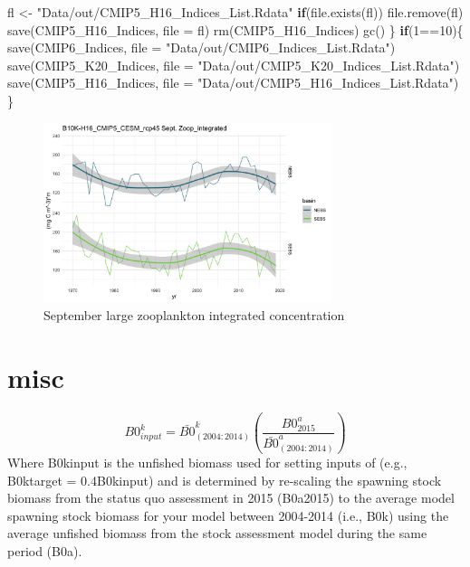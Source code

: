\documentclass[
]{article}
\newenvironment{Shaded}{\begin{snugshade}}{\end{snugshade}}
\newcommand{\AttributeTok}[1]{\textcolor[rgb]{0.77,0.63,0.00}{#1}}
\newcommand{\ControlFlowTok}[1]{\textcolor[rgb]{0.13,0.29,0.53}{\textbf{#1}}}
\newcommand{\DecValTok}[1]{\textcolor[rgb]{0.00,0.00,0.81}{#1}}
\newcommand{\FunctionTok}[1]{\textcolor[rgb]{0.00,0.00,0.00}{#1}}
\newcommand{\NormalTok}[1]{#1}
\newcommand{\OtherTok}[1]{\textcolor[rgb]{0.56,0.35,0.01}{#1}}
\newcommand{\SpecialCharTok}[1]{\textcolor[rgb]{0.00,0.00,0.00}{#1}}
\newcommand{\StringTok}[1]{\textcolor[rgb]{0.31,0.60,0.02}{#1}}
\begin{document}
\begin{Shaded}
\begin{Highlighting}[]
\NormalTok{      fl }\OtherTok{\textless{}{-}} \StringTok{"Data/out/CMIP5\_H16\_Indices\_List.Rdata"}
      \ControlFlowTok{if}\NormalTok{(}\FunctionTok{file.exists}\NormalTok{(fl)) }\FunctionTok{file.remove}\NormalTok{(fl)}
      \FunctionTok{save}\NormalTok{(CMIP5\_H16\_Indices, }\AttributeTok{file =}\NormalTok{ fl)}
      \FunctionTok{rm}\NormalTok{(CMIP5\_H16\_Indices)}
      \FunctionTok{gc}\NormalTok{()}
\NormalTok{    \}}
    \ControlFlowTok{if}\NormalTok{(}\DecValTok{1}\SpecialCharTok{==}\DecValTok{10}\NormalTok{)\{}
      \FunctionTok{save}\NormalTok{(CMIP6\_Indices, }\AttributeTok{file =} \StringTok{"Data/out/CMIP6\_Indices\_List.Rdata"}\NormalTok{)}
      \FunctionTok{save}\NormalTok{(CMIP5\_K20\_Indices, }\AttributeTok{file =} \StringTok{"Data/out/CMIP5\_K20\_Indices\_List.Rdata"}\NormalTok{)}
      \FunctionTok{save}\NormalTok{(CMIP5\_H16\_Indices, }\AttributeTok{file =} \StringTok{"Data/out/CMIP5\_H16\_Indices\_List.Rdata"}\NormalTok{)}
\NormalTok{    \}}
\end{Highlighting}
\end{Shaded}

\begin{figure}
\centering
\includegraphics[width=0.75\textwidth,height=\textheight]{Figs/Hind_Sept_large_Zoop.jpg}
\caption{September large zooplankton integrated concentration}
\end{figure}

\hypertarget{misc}{%
\section{misc}\label{misc}}

\[B0^k_{input}= \bar{B0}^k_{(2004:2014)}\left(\frac{B0^{a}_{2015}}{\bar{B0}^a_{(2004:2014)}}\right) \]
Where B0kinput is the unfished biomass used for setting inputs of (e.g.,
B0ktarget = 0.4B0kinput) and is determined by re-scaling the spawning
stock biomass from the status quo assessment in 2015 (B0a2015) to the
average model spawning stock biomass for your model between 2004-2014
(i.e., B0k) using the average unfished biomass from the stock assessment
model during the same period (B0a).
\end{document}
